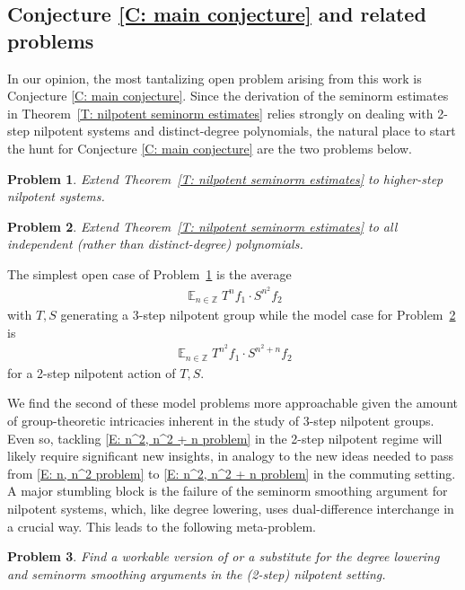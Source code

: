 \documentclass[11pt]{amsart}
\newtheorem{problem}{Problem}
\theoremstyle{definition}
\DeclareMathOperator*{\E}{\mathbb{E}}
\newcommand{\Z}{{\mathbb Z}}
\newcommand{\1}{{\mathbf{1}}}
\begin{document}
\subsection{Conjecture \ref{C: main conjecture} and related problems}\label{SS: main open problems}
In our opinion, the most tantalizing open problem arising from this work is Conjecture \ref{C: main conjecture}. Since the derivation of the seminorm estimates in Theorem~\ref{T: nilpotent seminorm estimates} relies strongly on dealing with 2-step nilpotent systems and distinct-degree polynomials, the natural place to start the hunt for Conjecture \ref{C: main conjecture} are the two problems below.

\begin{problem}\label{Pr: stronger seminorm estimates 1}
    Extend Theorem~\ref{T: nilpotent seminorm estimates} to higher-step nilpotent systems.
\end{problem}
\begin{problem}\label{Pr: stronger seminorm estimates 2}
    Extend Theorem~\ref{T: nilpotent seminorm estimates} to all independent (rather than distinct-degree) polynomials.
\end{problem}
The simplest open case of Problem~\ref{Pr: stronger seminorm estimates 1} is the average
\begin{align}\label{E: n, n^2 problem}
    \E_{n\in\Z} T^n f_1\cdot S^{n^2}f_2
\end{align}
with $T, S$ generating a 3-step nilpotent group while the model case for Problem~\ref{Pr: stronger seminorm estimates 2} is
\begin{align}\label{E: n^2, n^2 + n problem}
    \E_{n\in\Z} T^{n^2} f_1\cdot S^{n^2+n}f_2
\end{align}
for a 2-step nilpotent action of $T, S$. 

We find the second of these model problems more approachable given the amount of group-theoretic intricacies inherent in the study of 3-step nilpotent groups. Even so, tackling \eqref{E: n^2, n^2 + n problem} in the 2-step nilpotent regime will likely require significant new insights, in analogy to the new ideas needed to pass from \eqref{E: n, n^2 problem} to \eqref{E: n^2, n^2 + n problem} in the commuting setting. A major stumbling block is the failure of the seminorm smoothing argument for nilpotent systems, which, like degree lowering, uses dual-difference interchange in a crucial way. This leads to the following meta-problem.
\begin{problem}\label{Pr: degree lowering}
    Find a workable version of or a substitute for the degree lowering and seminorm smoothing arguments in the (2-step) nilpotent setting. 
\end{problem}
\end{document}
